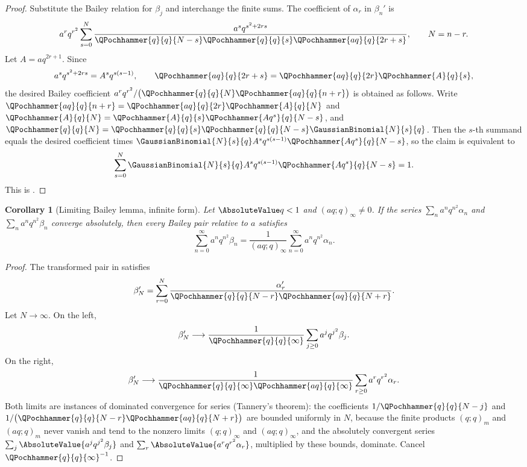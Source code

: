 \documentclass[11pt,a4paper,oneside,openany]{book}
\newtheorem{corollary}[corollary]{Corollary}
\theoremstyle{definition}
\theoremstyle{remark}
\begin{document}
\begin{proof}
Substitute the Bailey relation for $\beta_j$ and interchange the finite sums.  The coefficient of $\alpha_r$ in $\beta_n'$ is
\[
 a^rq^{r^2}\sum_{s=0}^{N}
 \frac{a^sq^{s^2+2rs}}
 {\QPochhammer{q}{q}{N-s}\QPochhammer{q}{q}{s}
  \QPochhammer{aq}{q}{2r+s}},
 \qquad N=n-r.
\]
Let $A=aq^{2r+1}$.  Since
\[
 a^sq^{s^2+2rs}=A^sq^{s(s-1)},
 \qquad
 \QPochhammer{aq}{q}{2r+s}
 =\QPochhammer{aq}{q}{2r}\QPochhammer{A}{q}{s},
\]
the desired Bailey coefficient
\(
 a^rq^{r^2}/
 \bigl(\QPochhammer{q}{q}{N}\QPochhammer{aq}{q}{n+r}\bigr)
\)
is obtained as follows.
Write $\QPochhammer{aq}{q}{n+r}=\QPochhammer{aq}{q}{2r}\QPochhammer{A}{q}{N}$
and $\QPochhammer{A}{q}{N}=\QPochhammer{A}{q}{s}\QPochhammer{Aq^s}{q}{N-s}$,
and $\QPochhammer{q}{q}{N}=\QPochhammer{q}{q}{s}\QPochhammer{q}{q}{N-s}\GaussianBinomial{N}{s}{q}$.
Then the $s$-th summand equals the desired coefficient times
$\GaussianBinomial{N}{s}{q}A^sq^{s(s-1)}\QPochhammer{Aq^s}{q}{N-s}$, so the
claim is equivalent to
\[
 \sum_{s=0}^{N}\GaussianBinomial{N}{s}{q} A^sq^{s(s-1)}
 \QPochhammer{Aq^s}{q}{N-s}=1.
\]
This is .
\end{proof}

\begin{corollary}[Limiting Bailey lemma, infinite form]\label{cor:bailey-limit-infinite}
Let $\AbsoluteValue q<1$ and $(aq;q)_\infty\ne0$.  If the series
$\sum_na^nq^{n^2}\alpha_n$ and $\sum_na^nq^{n^2}\beta_n$ converge absolutely,
then every Bailey pair relative to $a$ satisfies
\[
 \sum_{n=0}^{\infty}a^nq^{n^2}\beta_n
 =\frac1{(aq;q)_\infty}
 \sum_{n=0}^{\infty}a^nq^{n^2}\alpha_n.
\]
\end{corollary}

\begin{proof}
The transformed pair in  satisfies
\[
 \beta_N'=\sum_{r=0}^{N}
 \frac{\alpha_r'}
      {\QPochhammer{q}{q}{N-r}\QPochhammer{aq}{q}{N+r}}.
\]
Let $N\to\infty$.  On the left,
\[
 \beta_N'\longrightarrow\frac1{\QPochhammer{q}{q}{\infty}}
 \sum_{j\ge0}a^jq^{j^2}\beta_j.
\]
On the right,
\[
 \beta_N'\longrightarrow
 \frac1{\QPochhammer{q}{q}{\infty}\QPochhammer{aq}{q}{\infty}}
 \sum_{r\ge0}a^rq^{r^2}\alpha_r.
\]
Both limits are instances of dominated convergence for series (Tannery's
theorem): the coefficients $1/\QPochhammer{q}{q}{N-j}$ and
$1/\bigl(\QPochhammer{q}{q}{N-r}\QPochhammer{aq}{q}{N+r}\bigr)$ are bounded
uniformly in $N$, because the finite products $(q;q)_m$ and $(aq;q)_m$ never
vanish and tend to the nonzero limits $(q;q)_\infty$ and $(aq;q)_\infty$, and
the absolutely convergent series $\sum_j\AbsoluteValue{a^jq^{j^2}\beta_j}$
and $\sum_r\AbsoluteValue{a^rq^{r^2}\alpha_r}$, multiplied by these bounds,
dominate.  Cancel $\QPochhammer{q}{q}{\infty}^{-1}$.
\end{proof}
\end{document}
